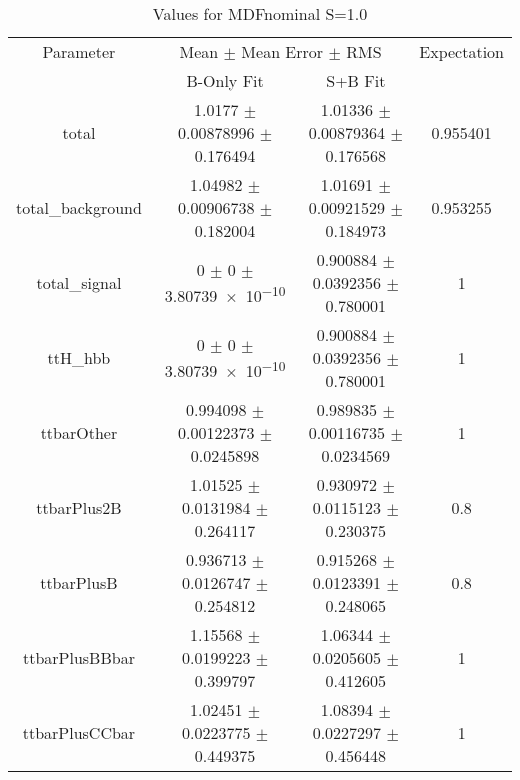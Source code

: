 \begin{table}
\centering
\caption{Values for MDFnominal S=1.0}
\begin{tabular}{cccc}
\toprule
Parameter & \multicolumn{2}{c}{Mean $\pm$ Mean Error $\pm$ RMS} & Expectation\\
 & B-Only Fit & S+B Fit & \\
\midrule
total & \num{1.0177} $\pm$ \num{0.00878996} $\pm$ \num{0.176494} & \num{1.01336} $\pm$ \num{0.00879364} $\pm$ \num{0.176568} & \num{0.955401}\\
total\_background & \num{1.04982} $\pm$ \num{0.00906738} $\pm$ \num{0.182004} & \num{1.01691} $\pm$ \num{0.00921529} $\pm$ \num{0.184973} & \num{0.953255}\\
total\_signal & \num{0} $\pm$ \num{0} $\pm$ \num{3.80739e-10} & \num{0.900884} $\pm$ \num{0.0392356} $\pm$ \num{0.780001} & \num{1}\\
ttH\_hbb & \num{0} $\pm$ \num{0} $\pm$ \num{3.80739e-10} & \num{0.900884} $\pm$ \num{0.0392356} $\pm$ \num{0.780001} & \num{1}\\
ttbarOther & \num{0.994098} $\pm$ \num{0.00122373} $\pm$ \num{0.0245898} & \num{0.989835} $\pm$ \num{0.00116735} $\pm$ \num{0.0234569} & \num{1}\\
ttbarPlus2B & \num{1.01525} $\pm$ \num{0.0131984} $\pm$ \num{0.264117} & \num{0.930972} $\pm$ \num{0.0115123} $\pm$ \num{0.230375} & \num{0.8}\\
ttbarPlusB & \num{0.936713} $\pm$ \num{0.0126747} $\pm$ \num{0.254812} & \num{0.915268} $\pm$ \num{0.0123391} $\pm$ \num{0.248065} & \num{0.8}\\
ttbarPlusBBbar & \num{1.15568} $\pm$ \num{0.0199223} $\pm$ \num{0.399797} & \num{1.06344} $\pm$ \num{0.0205605} $\pm$ \num{0.412605} & \num{1}\\
ttbarPlusCCbar & \num{1.02451} $\pm$ \num{0.0223775} $\pm$ \num{0.449375} & \num{1.08394} $\pm$ \num{0.0227297} $\pm$ \num{0.456448} & \num{1}\\
\bottomrule
\end{tabular}
\end{table}